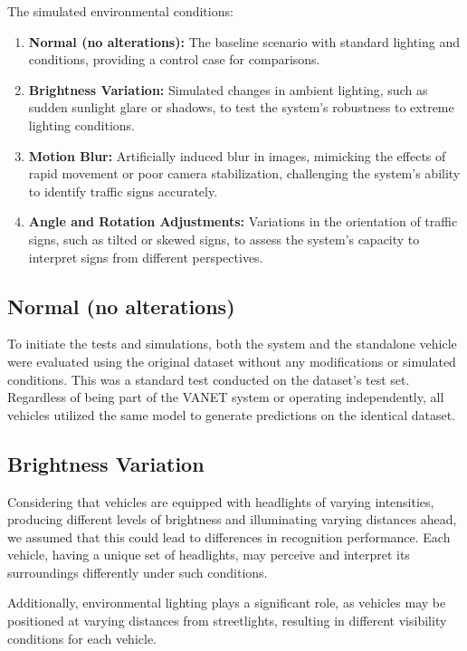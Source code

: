    The simulated environmental conditions:
   
   \begin{enumerate}
       \item \textbf{Normal (no alterations):} The baseline scenario with standard lighting and conditions, providing a control case for comparisons.
       \item \textbf{Brightness Variation:} Simulated changes in ambient lighting, such as sudden sunlight glare or shadows, to test the system's robustness to extreme lighting conditions.
       \item \textbf{Motion Blur:} Artificially induced blur in images, mimicking the effects of rapid movement or poor camera stabilization, challenging the system's ability to identify traffic signs accurately.
       \item \textbf{Angle and Rotation Adjustments:} Variations in the orientation of traffic signs, such as tilted or skewed signs, to assess the system's capacity to interpret signs from different perspectives.
   \end{enumerate}
   


\newpage

\subsection{Normal (no alterations)}

To initiate the tests and simulations, both the system and the standalone vehicle were evaluated using the original dataset
 without any modifications or simulated conditions. This was a standard test conducted on the dataset's test set. Regardless
  of being part of the VANET system or operating independently, all vehicles utilized the same model to generate predictions
   on the identical dataset.

\subsection{Brightness Variation}

Considering that vehicles are equipped with headlights of varying intensities, producing different levels 
of brightness and illuminating varying distances ahead, we assumed that this could lead to differences in 
recognition performance. Each vehicle, having a unique set of headlights, may perceive and interpret its 
surroundings differently under such conditions. 

Additionally, environmental lighting plays a significant role, as vehicles may be positioned at varying distances 
from streetlights, resulting in different visibility conditions for each vehicle.

